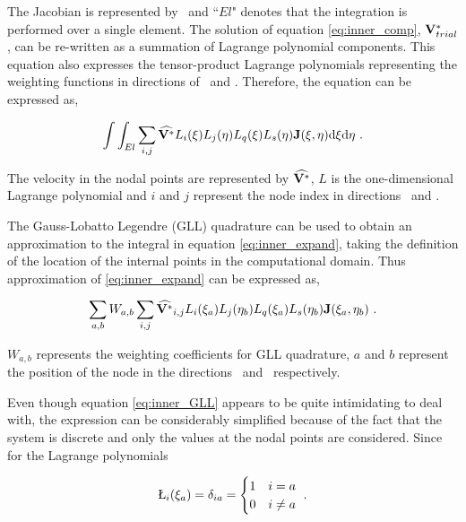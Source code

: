 The Jacobian is represented by \jacobian\ and ``$El$" denotes that the integration is performed over a single element. The solution of equation \ref{eq:inner_comp}, $\mathbf{V}_{trial}^{*}$, can be re-written as a summation of Lagrange polynomial components. This equation also expresses the tensor-product Lagrange polynomials representing the weighting functions in directions of \compone\ and \comptwo. Therefore, the equation can be expressed as,    

 \begin{equation} \centering
 \label{eq:inner_expand}
 \int\int_{El}\sum_{i,j}\widehat{\Vint}L_{i}(\compone)L_{j}(\comptwo)L_{q}(\compone)L_{s}(\comptwo)\jacobian(\compone, \comptwo)\mathrm{d}\compone \mathrm{d}\comptwo ~.
 \end{equation}
 
 The velocity in the nodal points are represented by $\widehat{\mathbf{V}^{*}}$, $L$ is the one-dimensional Lagrange polynomial and $i$ and $j$ represent the node index in directions \compone\ and \comptwo. 

The Gauss-Lobatto Legendre (GLL) quadrature can be used to obtain an approximation to the integral in equation \ref{eq:inner_expand}, taking the definition of the location of the internal points in the computational domain. Thus approximation of \ref{eq:inner_expand} can be expressed as,

\begin{equation} \centering
\label{eq:inner_GLL}
\sum_{a,b}W_{a,b}\sum_{i,j}\widehat{\Vint}_{i,j}L_{i}(\compone_{a})L_{j}(\comptwo_{b})L_{q}(\compone_{a})L_{s}(\comptwo_{b})\jacobian(\compone_{a}, \comptwo_{b}) ~.
\end{equation}

$W_{a,b}$ represents the weighting coefficients for GLL quadrature, $a$ and $b$ represent the position of the node in the directions \compone\ and \comptwo\ respectively. 


Even though equation \ref{eq:inner_GLL} appears to be quite intimidating to deal with, the expression can be considerably simplified because of the fact that the system is discrete and only the values at the nodal points are considered. Since for the Lagrange polynomials

 \begin{gather}
 \label{eq:kronecker}
 \L_{i}(\compone_{a}) = \delta_{ia} = \begin{cases}
 1 & i = a    \\
 0 & i \neq a \\
 \end{cases} ~.
 \end{gather}
 
